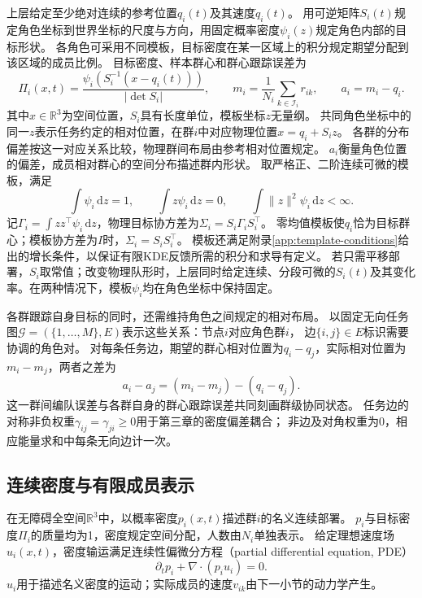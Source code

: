 \documentclass[UTF8,a4paper,11pt,fontset=none]{ctexart}
\newcommand{\R}{\mathbb R}\newcommand{\KL}{\operatorname{KL}}
\begin{document}
上层给定至少绝对连续的参考位置$q_i(t)$及其速度$\dot q_i(t)$。
用可逆矩阵$S_i(t)$规定角色坐标到世界坐标的尺度与方向，用固定概率密度$\psi_i(z)$规定角色内部的目标形状。
各角色可采用不同模板，目标密度在某一区域上的积分规定期望分配到该区域的成员比例。
目标密度、样本群心和群心跟踪误差为
\begin{equation}
\Pi_i(x,t)=\frac{\psi_i(S_i^{-1}(x-q_i(t)))}{|\det S_i|},\qquad
m_i=\frac1{N_i}\sum_{k\in\mathcal I_i}r_{ik},\qquad a_i=m_i-q_i .
\label{eq:target}
\end{equation}
其中$x\in\R^3$为空间位置，$S_i$具有长度单位，模板坐标$z$无量纲。
共同角色坐标中的同一$z$表示任务约定的相对位置，在群$i$中对应物理位置$x=q_i+S_i z$。
各群的分布偏差按这一对应关系比较，物理群间布局由参考相对位置规定。
$a_i$衡量角色位置的偏差，成员相对群心的空间分布描述群内形状。
取严格正、二阶连续可微的模板，满足
\begin{equation}
\int\psi_i\,\mathrm dz=1,\qquad
\int z\psi_i\,\mathrm dz=0,\qquad
\int\|z\|^2\psi_i\,\mathrm dz<\infty .
\label{eq:template-moments}
\end{equation}
记$\Gamma_i=\int zz^\top\psi_i\,\mathrm dz$，物理目标协方差为$\Sigma_i=S_i\Gamma_iS_i^\top$。
零均值模板使$q_i$恰为目标群心；模板协方差为$I$时，$\Sigma_i=S_iS_i^\top$。
模板还满足附录\ref{app:template-conditions}给出的增长条件，以保证有限KDE反馈所需的积分和求导有定义。
若只需平移部署，$S_i$取常值；改变物理队形时，上层同时给定连续、分段可微的$S_i(t)$及其变化率。在两种情况下，模板$\psi_i$均在角色坐标中保持固定。

各群跟踪自身目标的同时，还需维持角色之间规定的相对布局。
以固定无向任务图$\mathcal G=(\{1,\ldots,M\},E)$表示这些关系：节点$i$对应角色群$i$，
边$\{i,j\}\in E$标识需要协调的角色对。
对每条任务边，期望的群心相对位置为$q_i-q_j$，实际相对位置为$m_i-m_j$，两者之差为
\[
a_i-a_j=(m_i-m_j)-(q_i-q_j).
\]
这一群间编队误差与各群自身的群心跟踪误差共同刻画群级协同状态。
任务边的对称非负权重$\gamma_{ij}=\gamma_{ji}\ge0$用于第三章的密度偏差耦合；
非边及对角权重为0，相应能量求和中每条无向边计一次。

\subsection{连续密度与有限成员表示}
在无障碍全空间$\R^3$中，以概率密度$p_i(x,t)$描述群$i$的名义连续部署。
$p_i$与目标密度$\Pi_i$的质量均为1，密度规定空间分配，人数由$N_i$单独表示。
给定理想速度场$u_i(x,t)$，密度输运满足连续性偏微分方程（partial differential equation, PDE）
\begin{equation}
\partial_t p_i+\nabla\cdot(p_i u_i)=0.
\label{eq:pde}
\end{equation}
$u_i$用于描述名义密度的运动；实际成员的速度$v_{ik}$由下一小节的动力学产生。
\end{document}
